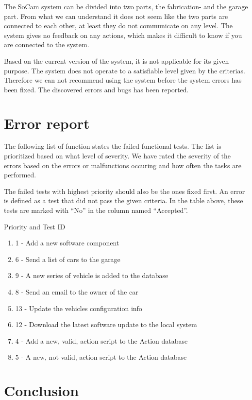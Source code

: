 		The SoCam system can be divided into two parts, the fabrication- and the garage part. 
		From what we can understand it does not seem like the two parts are connected to each 
		other, at least they do not communicate on any level.  The system gives no feedback on 
		any actions, which makes it difficult to know if you are connected to the system. 

		Based on the current version of the system, it is not applicable for its given purpose. 
		The system does not operate to a satisfiable level given by the criterias. Therefore we 
		can not recommend using the system before the system errors has been fixed. The discovered 
		errors and bugs has been reported. 

	\clearpage
	\section{Error report}

		The following list of function states the failed functional tests. The list is prioritized 
		based on what level of severity. We have rated the severity of the errors based on the 
		errors or malfunctions occuring and how often the tasks are performed. 

		The failed tests with highest priority should also be the ones fixed first. An error is 
		defined as a test that did not pass the given criteria. In the table above, these tests 
		are marked with “No” in the column named “Accepted”. 

		Priority and Test ID
		\begin{enumerate}
			\item 1 - Add a new software component
			\item 6 - Send a list of cars to the garage
			\item 9 - A new series of vehicle is added to the database
			\item 8 - Send an email to the owner of the car
			\item 13 - Update the vehicles configuration info
			\item 12 - Download the latest software update to the local system
			\item 4 - Add a new, valid, action script to the Action database
			\item 5 - A new, not valid, action script to the Action database
			
		\end{enumerate}	


	\section{Conclusion}

